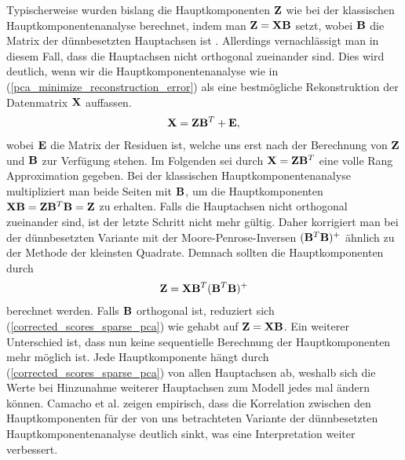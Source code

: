 Typischerweise wurden bislang die Hauptkomponenten $\mathbf{Z}$ wie bei der klassischen Hauptkomponentenanalyse berechnet, indem man $\mathbf{Z} = \mathbf{X} \mathbf{B}$ setzt, wobei $\mathbf{B}$ die Matrix der dünnbesetzten Hauptachsen ist \cite{zou_sparsepca}. Allerdings vernachlässigt man in diesem Fall, dass die Hauptachsen nicht orthogonal zueinander sind. Dies wird deutlich, wenn wir die Hauptkomponentenanalyse wie in (\ref{pca_minimize_reconstruction_error}) als eine bestmögliche Rekonstruktion der Datenmatrix $\mathbf{X}$ auffassen.
\begin{align}
\label{pca_scores_loadings_model}
\mathbf{X} = \mathbf{Z} \mathbf{B}^T + \mathbf{E},
\end{align}
wobei $\mathbf{E}$ die Matrix der Residuen ist, welche uns erst nach der Berechnung von $\mathbf{Z}$ und $\mathbf{B}$ zur Verfügung stehen. Im Folgenden sei durch $\mathbf{X} = \mathbf{Z} \mathbf{B}^T$ eine volle Rang Approximation gegeben. Bei der klassischen Hauptkomponentenanalyse multipliziert man beide Seiten mit $\mathbf{B}$, um die Hauptkomponenten $\mathbf{X} \mathbf{B} = \mathbf{Z} \mathbf{B}^T \mathbf{B} = \mathbf{Z}$ zu erhalten. Falls die Hauptachsen nicht orthogonal zueinander sind, ist der letzte Schritt nicht mehr gültig. Daher korrigiert man bei der dünnbesetzten Variante mit der Moore-Penrose-Inversen $(\mathbf{B}^T \mathbf{B})^+$ ähnlich zu der Methode der kleinsten Quadrate. Demnach sollten die Hauptkomponenten durch
\begin{align}
\label{corrected_scores_sparse_pca}
\mathbf{Z} = \mathbf{X} \mathbf{B}^T (\mathbf{B}^T \mathbf{B})^+
\end{align}
berechnet werden. Falls $\mathbf{B}$ orthogonal ist, reduziert sich (\ref{corrected_scores_sparse_pca}) wie gehabt auf $\mathbf{Z} = \mathbf{X} \mathbf{B}$. Ein weiterer Unterschied ist, dass nun keine sequentielle Berechnung der Hauptkomponenten mehr möglich ist. Jede Hauptkomponente hängt durch (\ref{corrected_scores_sparse_pca}) von allen Hauptachsen ab, weshalb sich die Werte bei Hinzunahme weiterer Hauptachsen zum Modell jedes mal ändern können. Camacho et al. zeigen empirisch, dass die Korrelation zwischen den Hauptkomponenten für der von uns betrachteten Variante der dünnbesetzten Hauptkomponentenanalyse deutlich sinkt, was eine Interpretation weiter verbessert.

